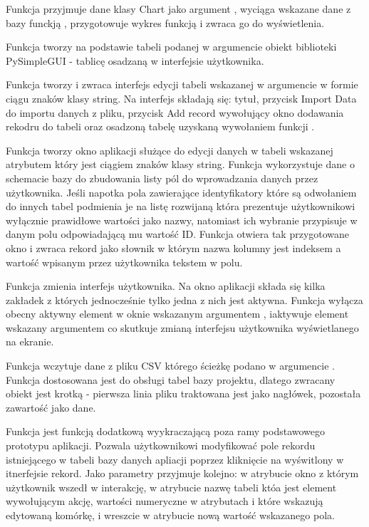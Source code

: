\documentclass[a4paper,10pt, twoside]{report}
\begin{document}
\medskip
{Funkcja  przyjmuje dane klasy Chart jako argument 
, wyciąga wskazane dane z bazy funckją 
, przygotowuje wykres funkcją 
 i zwraca go do wyświetlenia.}

\medskip
{Funkcja  tworzy na podstawie tabeli podanej w 
argumencie  obiekt biblioteki PySimpleGUI - tablicę osadzaną w
 interfejsie użytkownika.}

\medskip
{Funkcja  tworzy i zwraca interfejs 
edycji tabeli wskazanej w argumencie  w formie ciągu znaków 
klasy string. Na interfejs składają się: tytuł, przycisk Import Data do importu 
danych z pliku, przycisk Add record wywołujący okno dodawania rekodru do tabeli 
oraz osadzoną tabelę uzyskaną wywołaniem funkcji .}

\medskip
{Funkcja  tworzy okno aplikacji służące do 
edycji danych w tabeli wskazanej atrybutem  który jest ciągiem 
znaków klasy string. Funkcja wykorzystuje dane o schemacie bazy do zbudowania 
listy pól do wprowadzania danych przez użytkownika. Jeśli napotka pola 
zawierające identyfikatory które są odwołaniem do innych tabel podmienia je na 
listę rozwijaną która prezentuje użytkownikowi wyłącznie prawidłowe wartości 
jako nazwy, natomiast ich wybranie przypisuje w danym polu odpowiadającą mu 
wartość ID. Funkcja otwiera tak przygotowane okno i zwraca rekord jako słownik 
w którym nazwa kolumny jest indeksem a wartość wpisanym przez użytkownika 
tekstem w polu.}

\medskip
{Funkcja  zmienia interfejs 
użytkownika. Na okno aplikacji składa się kilka zakładek z których jednocześnie 
tylko jedna z nich jest aktywna. Funkcja wyłącza obecny aktywny element w oknie 
wskazanym argumentem , iaktywuje element wskazany argumentem 
 co skutkuje zmianą interfejsu użytkownika wyświetlanego na 
ekranie.}

\medskip
{Funkcja  wczytuje dane z pliku CSV którego
 ścieżkę podano w argumencie . Funkcja dostosowana jest do 
obsługi tabel bazy projektu, dlatego zwracany obiekt jest krotką - pierwsza 
linia pliku traktowana jest jako nagłówek, pozostała zawartość jako dane.}

\medskip
{Funkcja  jest funkcją 
dodatkową wyykraczającą poza ramy podstawowego prototypu aplikacji. Pozwala 
użytkownikowi modyfikować pole rekordu istniejącego w tabeli bazy danych 
apliacji poprzez kliknięcie na wyświtlony w itnerfejsie rekord. Jako parametry 
przyjmuje kolejno: w atrybucie  okno z którym użytkownik 
wszedł w interakcję, w atrybucie  nazwę tabeli któa jest element
 wywołującym akcję, wartości numeryczne w atrybutach  i 
 które wskazują edytowaną komórkę, i wreszcie w atrybucie 
 nową wartość wskazanego pola.}
\end{document}
